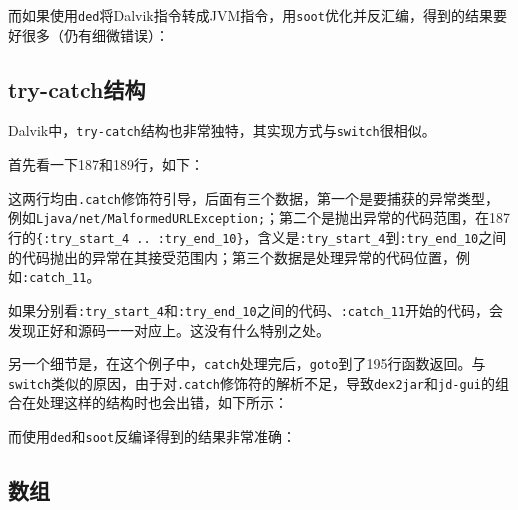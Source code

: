 而如果使用\lstinline!ded!将Dalvik指令转成JVM指令，用\lstinline!soot!优化并反汇编，得到的结果要好很多（仍有细微错误）：


\subsection{try-catch结构}
\label{SubSec:dalvik-smali-trycatch}



Dalvik中，\lstinline!try-catch!结构也非常独特，其实现方式与\lstinline!switch!很相似。

首先看一下187和189行，如下：


这两行均由\lstinline!.catch!修饰符引导，后面有三个数据，第一个是要捕获的异常类型，例如\lstinline!Ljava/net/MalformedURLException;!；第二个是抛出异常的代码范围，在187行的\lstinline!{:try_start_4 .. :try_end_10}!，含义是\lstinline!:try_start_4!到\lstinline!:try_end_10!之间的代码抛出的异常在其接受范围内；第三个数据是处理异常的代码位置，例如\lstinline!:catch_11!。

如果分别看\lstinline!:try_start_4!和\lstinline!:try_end_10!之间的代码、\lstinline!:catch_11!开始的代码，会发现正好和源码一一对应上。这没有什么特别之处。

另一个细节是，在这个例子中，\lstinline!catch!处理完后，\lstinline!goto!到了195行函数返回。与\lstinline!switch!类似的原因，由于对\lstinline!.catch!修饰符的解析不足，导致\lstinline!dex2jar!和\lstinline!jd-gui!的组合在处理这样的结构时也会出错，如下所示：


而使用\lstinline!ded!和\lstinline!soot!反编译得到的结果非常准确：


\subsection{数组}



